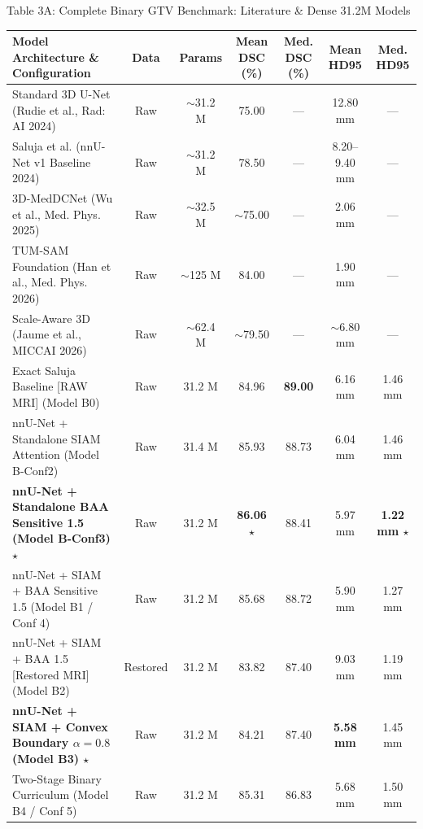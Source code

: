 \documentclass[aspectratio=169, 10pt]{beamer}
\begin{document}
\begin{frame}{Table 3A: Complete Binary GTV Benchmark: Literature \& Dense 31.2M Models}
  \begin{table}
    \centering
    \tiny
    \begin{tabular}{lcccccc}
      \toprule
      \textbf{Model Architecture \& Configuration} & \textbf{Data} & \textbf{Params} & \textbf{Mean DSC (\%)} & \textbf{Med. DSC (\%)} & \textbf{Mean HD95} & \textbf{Med. HD95} \\
      \midrule
      Standard 3D U-Net (Rudie et al., Rad: AI 2024) & Raw & $\sim$31.2 M & 75.00 & --- & 12.80 mm & --- \\
      Saluja et al. (nnU-Net v1 Baseline 2024) & Raw & $\sim$31.2 M & 78.50 & --- & 8.20--9.40 mm & --- \\
      3D-MedDCNet (Wu et al., Med. Phys. 2025) & Raw & $\sim$32.5 M & $\sim$75.00 & --- & 2.06 mm & --- \\
      TUM-SAM Foundation (Han et al., Med. Phys. 2026) & Raw & $\sim$125 M & 84.00 & --- & 1.90 mm & --- \\
      Scale-Aware 3D (Jaume et al., MICCAI 2026) & Raw & $\sim$62.4 M & $\sim$79.50 & --- & $\sim$6.80 mm & --- \\
      Exact Saluja Baseline [RAW MRI] (Model B0) & Raw & 31.2 M & 84.96 & \textbf{89.00} & 6.16 mm & 1.46 mm \\
      nnU-Net + Standalone SIAM Attention (Model B-Conf2) & Raw & 31.4 M & 85.93 & 88.73 & 6.04 mm & 1.46 mm \\
      \textbf{nnU-Net + Standalone BAA Sensitive 1.5 (Model B-Conf3) $\star$} & Raw & 31.2 M & \textbf{86.06 $\star$} & 88.41 & 5.97 mm & \textbf{1.22 mm $\star$} \\
      nnU-Net + SIAM + BAA Sensitive 1.5 (Model B1 / Conf 4) & Raw & 31.2 M & 85.68 & 88.72 & 5.90 mm & 1.27 mm \\
      nnU-Net + SIAM + BAA 1.5 [Restored MRI] (Model B2) & Restored & 31.2 M & 83.82 & 87.40 & 9.03 mm & 1.19 mm \\
      \textbf{nnU-Net + SIAM + Convex Boundary $\alpha=0.8$ (Model B3) $\star$} & Raw & 31.2 M & 84.21 & 87.40 & \textbf{5.58 mm} & 1.45 mm \\
      Two-Stage Binary Curriculum (Model B4 / Conf 5) & Raw & 31.2 M & 85.31 & 86.83 & 5.68 mm & 1.50 mm \\

\end{tabular}
\end{table}
\end{frame}
\end{document}
